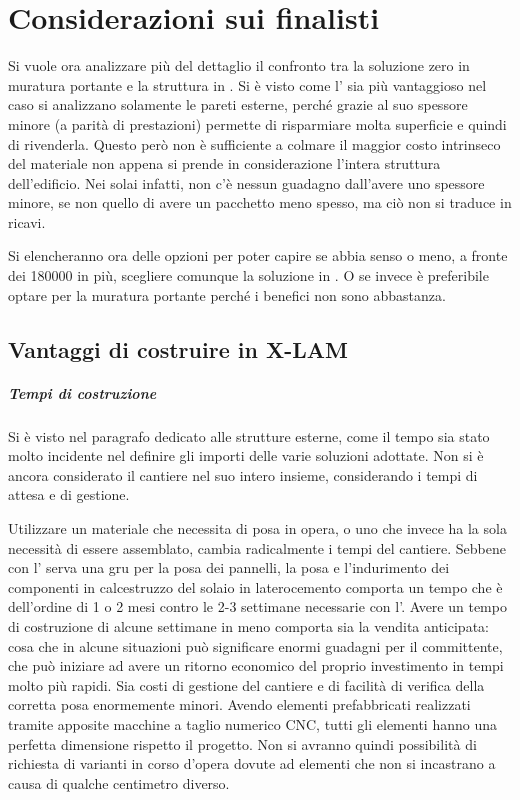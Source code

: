 \chapter{Considerazioni sui finalisti}
Si vuole ora analizzare più del dettaglio il confronto tra la soluzione zero in muratura portante e la struttura in \xlam. 
Si è visto come l'\xlam{} sia più vantaggioso nel caso si analizzano solamente le pareti esterne, perché grazie al suo spessore minore (a parità di prestazioni) permette di risparmiare molta superficie e quindi di rivenderla.
Questo però non è sufficiente a colmare il maggior costo intrinseco del materiale non appena si prende in considerazione l'intera struttura dell'edificio. 
Nei solai infatti, non c'è nessun guadagno dall'avere uno spessore minore, se non quello di avere un pacchetto meno spesso, ma ciò non si traduce in ricavi.

Si elencheranno ora delle opzioni per poter capire se abbia senso o meno, a fronte dei \SI{180000}{\teuro} in più, scegliere comunque la soluzione in \xlam. 
O se invece è preferibile optare per la muratura portante perché i benefici non sono abbastanza.
\section{Vantaggi di costruire in X-LAM}
\paragraph{Tempi di costruzione}
Si è visto nel paragrafo dedicato alle strutture esterne, come il tempo sia stato molto incidente nel definire gli importi delle varie soluzioni adottate.
Non si è ancora considerato il cantiere nel suo intero insieme, considerando i tempi di attesa e di gestione.

Utilizzare un materiale che necessita di posa in opera, o uno che invece ha la sola necessità di essere assemblato, cambia radicalmente i tempi del cantiere.
Sebbene con l'\xlam{} serva una gru per la posa dei pannelli, la posa e l'indurimento dei componenti in calcestruzzo del solaio in laterocemento comporta un tempo che è dell'ordine di 1 o 2 mesi contro le 2-3 settimane necessarie con l'\xlam. 
Avere un tempo di costruzione di alcune settimane in meno comporta sia la vendita anticipata: cosa che in alcune situazioni può significare enormi guadagni per il committente, che può iniziare ad avere un ritorno economico del proprio investimento in tempi molto più rapidi.
Sia costi di gestione del cantiere e di facilità di verifica della corretta posa enormemente minori. Avendo elementi prefabbricati realizzati tramite apposite macchine a taglio numerico CNC, tutti gli elementi hanno una perfetta dimensione rispetto il progetto. Non si avranno quindi possibilità di richiesta di varianti in corso d'opera dovute ad elementi che non si incastrano a causa di qualche centimetro diverso.

